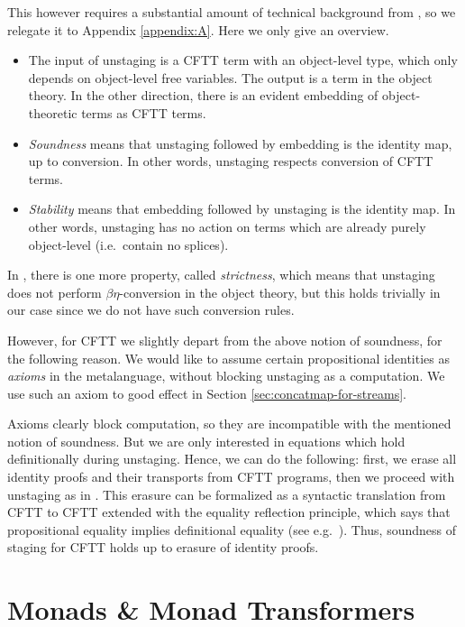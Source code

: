 \documentclass[acmsmall,screen]{acmart}
\theoremstyle{remark}
\begin{document}
This however requires a substantial amount of technical background from
\cite{staged2ltt}, so we relegate it to Appendix \ref{appendix:A}. Here we only
give an overview.
\begin{itemize}
\item The input of unstaging is a CFTT term with an object-level type, which
      only depends on object-level free variables. The output is a term in the
      object theory. In the other direction, there is an evident embedding of
      object-theoretic terms as CFTT terms.
\item \emph{Soundness} means that unstaging followed by embedding is the
      identity map, up to conversion. In other words, unstaging respects conversion
      of CFTT terms.
\item \emph{Stability} means that embedding followed by unstaging is the
      identity map. In other words, unstaging has no action on terms which are
      already purely object-level (i.e.\ contain no splices).
\end{itemize}
In \cite{staged2ltt}, there is one more property, called \emph{strictness},
which means that unstaging does not perform $\beta\eta$-conversion in the
object theory, but this holds trivially in our case since we do not have such
conversion rules.

However, for CFTT we slightly depart from the above notion of soundness, for the
following reason. We would like to assume certain propositional identities as
\emph{axioms} in the metalanguage, without blocking unstaging as a
computation. We use such an axiom to good effect in Section
\ref{sec:concatmap-for-streams}.

Axioms clearly block computation, so they are incompatible with the mentioned
notion of soundness. But we are only interested in equations which hold
definitionally during unstaging. Hence, we can do the following: first, we erase
all identity proofs and their transports from CFTT programs, then we proceed
with unstaging as in \cite{staged2ltt}. This erasure can be formalized as a
syntactic translation \cite{next700} from CFTT to CFTT extended with the
equality reflection principle, which says that propositional equality implies
definitional equality (see e.g.\ \cite{hofmann95conservativity}). Thus,
soundness of staging for CFTT holds up to erasure of identity proofs.

\section{Monads \& Monad Transformers}\label{sec:monad-transformers}
\end{document}
